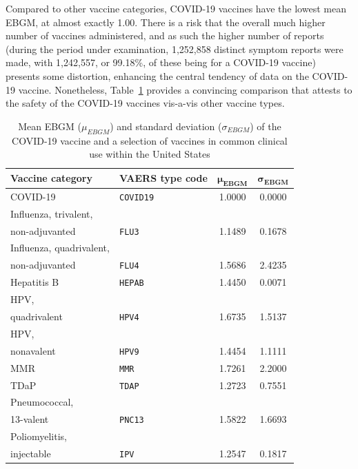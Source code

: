 \documentclass[12pt]{article}
\begin{document}
Compared to other vaccine categories, COVID-19 vaccines have the lowest mean EBGM, at almost exactly 1.00. There is a risk that the overall much higher number of vaccines administered, and as such the higher number of reports (during the period under examination, 1,252,858 distinct symptom reports were made, with 1,242,557, or 99.18\%, of these being for a COVID-19 vaccine) presents some distortion, enhancing the central tendency of data on the COVID-19 vaccine. Nonetheless, Table~\ref{tab:comparison_ebgm} provides a convincing comparison that attests to the safety of the COVID-19 vaccines vis-a-vis other vaccine types.

\begin{table}[]
\begin{tabular}{l  l  c  c}
\textbf{Vaccine category}                        & \textbf{VAERS type code} & $\mathbf{\mu_{EBGM}}$ & $\mathbf{\sigma_{EBGM}}$ \\
\hline
COVID-19                                & \texttt{COVID19}         & 1.0000    & 0.0000                     \\
\hline
Influenza, trivalent, \\ non-adjuvanted    & \texttt{FLU3}            & 1.1489    & 0.1678                     \\
\hline
Influenza, quadrivalent, \\ non-adjuvanted & \texttt{FLU4}            & 1.5686    & 2.4235                     \\
\hline
Hepatitis B                             & \texttt{HEPAB}           & 1.4450    & 0.0071                     \\
\hline
HPV, \\ quadrivalent                       & \texttt{HPV4}            & 1.6735    & 1.5137                     \\
\hline
HPV, \\ nonavalent                         & \texttt{HPV9}            & 1.4454    & 1.1111                     \\
\hline
MMR                                     & \texttt{MMR}             & 1.7261    & 2.2000                     \\
\hline
TDaP                                    & \texttt{TDAP}            & 1.2723    & 0.7551                     \\
\hline
Pneumococcal, \\ 13-valent                 & \texttt{PNC13}           & 1.5822    & 1.6693                     \\
\hline
Poliomyelitis, \\ injectable               & \texttt{IPV}             & 1.2547    & 0.1817                    
\end{tabular}
\caption{Mean EBGM ($\mu_{EBGM}$) and standard deviation ($\sigma_{EBGM}$) of the COVID-19 vaccine and a selection of vaccines in common clinical use within the United States}
\label{tab:comparison_ebgm}
\end{table}
\end{document}
